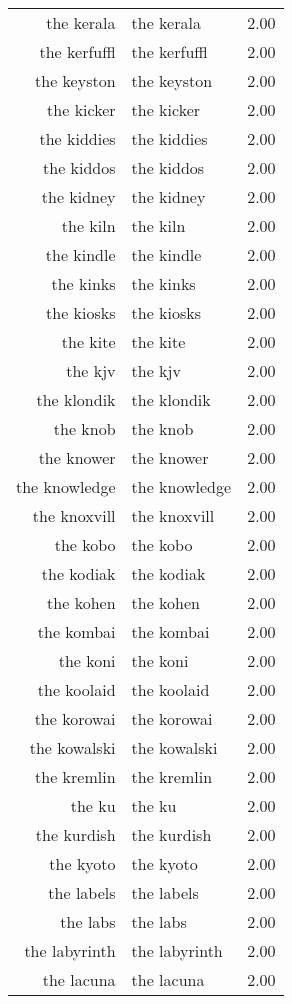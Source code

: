 \begin{table}[ht]
\begin{tabular}{rlr}
  the kerala & the kerala & 2.00 \\ 
  the kerfuffl & the kerfuffl & 2.00 \\ 
  the keyston & the keyston & 2.00 \\ 
  the kicker & the kicker & 2.00 \\ 
  the kiddies & the kiddies & 2.00 \\ 
  the kiddos & the kiddos & 2.00 \\ 
  the kidney & the kidney & 2.00 \\ 
  the kiln & the kiln & 2.00 \\ 
  the kindle & the kindle & 2.00 \\ 
  the kinks & the kinks & 2.00 \\ 
  the kiosks & the kiosks & 2.00 \\ 
  the kite & the kite & 2.00 \\ 
  the kjv & the kjv & 2.00 \\ 
  the klondik & the klondik & 2.00 \\ 
  the knob & the knob & 2.00 \\ 
  the knower & the knower & 2.00 \\ 
  the knowledge & the knowledge & 2.00 \\ 
  the knoxvill & the knoxvill & 2.00 \\ 
  the kobo & the kobo & 2.00 \\ 
  the kodiak & the kodiak & 2.00 \\ 
  the kohen & the kohen & 2.00 \\ 
  the kombai & the kombai & 2.00 \\ 
  the koni & the koni & 2.00 \\ 
  the koolaid & the koolaid & 2.00 \\ 
  the korowai & the korowai & 2.00 \\ 
  the kowalski & the kowalski & 2.00 \\ 
  the kremlin & the kremlin & 2.00 \\ 
  the ku & the ku & 2.00 \\ 
  the kurdish & the kurdish & 2.00 \\ 
  the kyoto & the kyoto & 2.00 \\ 
  the labels & the labels & 2.00 \\ 
  the labs & the labs & 2.00 \\ 
  the labyrinth & the labyrinth & 2.00 \\ 
  the lacuna & the lacuna & 2.00 \\ 

\end{tabular}
\end{table}

